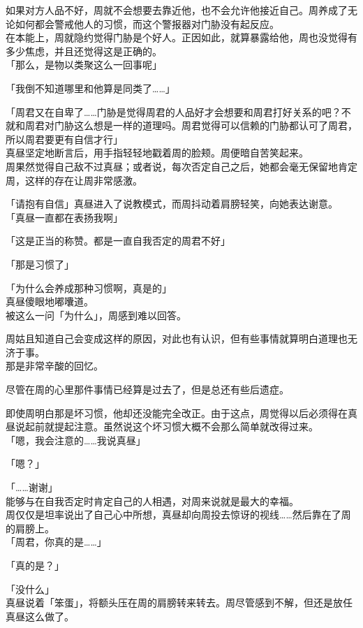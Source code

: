 如果对方人品不好，周就不会想要去靠近他，也不会允许他接近自己。周养成了无论如何都会警戒他人的习惯，而这个警报器对门胁没有起反应。\\

在本能上，周就隐约觉得门胁是个好人。正因如此，就算暴露给他，周也没觉得有多少焦虑，并且还觉得这是正确的。\\

「那么，是物以类聚这么一回事呢」

「我倒不知道哪里和他算是同类了……」

「周君又在自卑了……门胁是觉得周君的人品好才会想要和周君打好关系的吧？不就和周君对门胁这么想是一样的道理吗。周君觉得可以信赖的门胁都认可了周君，所以周君要更有自信才行」\\

真昼坚定地断言后，用手指轻轻地戳着周的脸颊。周便暗自苦笑起来。\\

周果然觉得自己敌不过真昼；或者说，每次否定自己之后，她都会毫无保留地肯定周，这样的存在让周非常感激。

「请抱有自信」真昼进入了说教模式，而周抖动着肩膀轻笑，向她表达谢意。\\

「真昼一直都在表扬我啊」

「这是正当的称赞。都是一直自我否定的周君不好」

「那是习惯了」

「为什么会养成那种习惯啊，真是的」\\

真昼傻眼地嘟囔道。\\

被这么一问「为什么」，周感到难以回答。

周姑且知道自己会变成这样的原因，对此也有认识，但有些事情就算明白道理也无济于事。\\

那是非常辛酸的回忆。

尽管在周的心里那件事情已经算是过去了，但是总还有些后遗症。

即使周明白那是坏习惯，他却还没能完全改正。由于这点，周觉得以后必须得在真昼说起前就提起注意。虽然说这个坏习惯大概不会那么简单就改得过来。\\

「嗯，我会注意的……我说真昼」

「嗯？」

「……谢谢」\\

能够与在自我否定时肯定自己的人相遇，对周来说就是最大的幸福。\\

周仅仅是坦率说出了自己心中所想，真昼却向周投去惊讶的视线……然后靠在了周的肩膀上。\\

「周君，你真的是……」

「真的是？」

「没什么」\\

真昼说着「笨蛋」，将额头压在周的肩膀转来转去。周尽管感到不解，但还是放任真昼这么做了。
